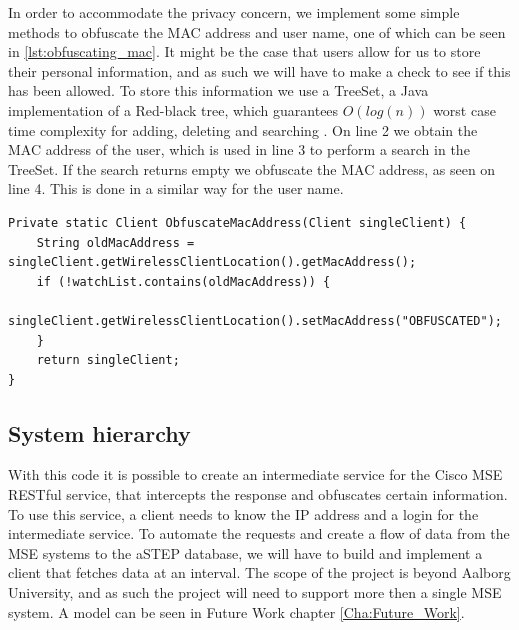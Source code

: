 In order to accommodate the privacy concern, we implement some simple methods to obfuscate the MAC address and user name, one of which can be seen in \cref{lst:obfuscating_mac}. It might be the case that users allow for us to store their personal information, and as such we will have to make a check to see if this has been allowed. To store this information we use a TreeSet, a Java implementation of a Red-black tree, which guarantees $O(log(n))$ worst case time complexity for adding, deleting and searching \cite{aa_book}\cite{treeset}. On line 2 we obtain the MAC address of the user, which is used in line 3 to perform a search in the TreeSet. If the search returns empty we obfuscate the MAC address, as seen on line 4. This is done in a similar way for the user name.

\begin{lstlisting}[caption={Obfuscating MAC address},label={lst:obfuscating_mac},language=inc_Java]
Private static Client ObfuscateMacAddress(Client singleClient) {
    String oldMacAddress = singleClient.getWirelessClientLocation().getMacAddress();
    if (!watchList.contains(oldMacAddress)) {
        singleClient.getWirelessClientLocation().setMacAddress("OBFUSCATED");
    }
    return singleClient;
}
\end{lstlisting}

\subsection{System hierarchy}\label{subsec:system_hierarchy}
With this code it is possible to create an intermediate service for the Cisco MSE RESTful service, that intercepts the response and obfuscates certain information. To use this service, a client needs to know the IP address and a login for the intermediate service. To automate the requests and create a flow of data from the MSE systems to the aSTEP database, we will have to build and implement a client that fetches data at an interval. The scope of the project is beyond Aalborg University, and as such the project will need to support more then a single MSE system. A model can be seen in Future Work chapter \ref{Cha:Future_Work}.